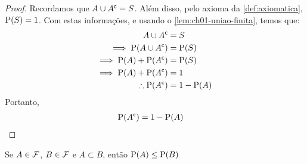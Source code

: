 \begin{proof}
    Recordamos que $A \cup {A}^{\mathsf{c}} = S$. Além disso,
    pelo axioma  da \cref{def:axiomatica},
    $\operatorname{P}(S) = 1$. Com estas informações, e usando o \cref{lem:ch01-uniao-finita}, temos que:
    \begin{align*}
        A \cup {A}^{\mathsf{c}} &= S \\
        \implies \operatorname{P}(A \cup {A}^{\mathsf{c}}) &= \operatorname{P}(S) \\
        \implies \operatorname{P}(A) + \operatorname{P}({A}^{\mathsf{c}}) &= \operatorname{P}(S) \\
        \implies \operatorname{P}(A) + \operatorname{P}({A}^{\mathsf{c}}) &= 1 \\
        \therefore \operatorname{P}({A}^{\mathsf{c}}) &= 1 - \operatorname{P}(A)
    \end{align*}
    Portanto,
    \begin{align*}
        \operatorname{P}({A}^{\mathsf{c}}) &= 1 - \operatorname{P}(A)
    \end{align*}
\end{proof}

\begin{lemma}\label{lem:ch01-subconjunto}
    Se $A \in \operatorname{\mathcal{F}}$, $B \in \operatorname{\mathcal{F}}$ e $A \subset B$,
    então $\operatorname{P}(A) \leq \operatorname{P}(B)$
\end{lemma}

